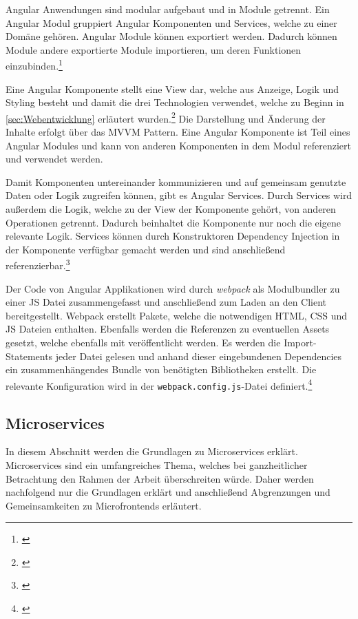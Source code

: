 Angular Anwendungen sind modular aufgebaut und in Module getrennt. Ein Angular Modul gruppiert Angular Komponenten und Services, welche zu einer Domäne gehören. Angular Module können exportiert werden. Dadurch können Module andere exportierte Module importieren, um deren Funktionen einzubinden.\footnote{\cite[vgl.][]{Angular2022d}}

Eine Angular Komponente stellt eine View dar, welche aus Anzeige, Logik und Styling besteht und damit die drei Technologien verwendet, welche zu Beginn in \cref{sec:Webentwicklung} erläutert wurden.\footnote{\cite[vgl.][]{Angular2022e}} Die Darstellung und Änderung der Inhalte erfolgt über das \gls{MVVM} Pattern. Eine Angular Komponente ist Teil eines Angular Modules und kann von anderen Komponenten in dem Modul referenziert und verwendet werden.

Damit Komponenten untereinander kommunizieren und auf gemeinsam genutzte Daten oder Logik zugreifen können, gibt es Angular Services. Durch Services wird außerdem die Logik, welche zu der View der Komponente gehört, von anderen Operationen getrennt. Dadurch beinhaltet die Komponente nur noch die eigene relevante Logik. Services können durch Konstruktoren Dependency Injection in der Komponente verfügbar gemacht werden und sind anschließend referenzierbar.\footnote{\cite[vgl.][]{Angular2022f}}

Der Code von Angular Applikationen wird durch \textit{webpack} als Modulbundler zu einer \gls{JS} Datei zusammengefasst und anschließend zum Laden an den Client bereitgestellt. Webpack erstellt Pakete, welche die notwendigen \gls{HTML}, \gls{CSS} und \gls{JS} Dateien enthalten. Ebenfalls werden die Referenzen zu eventuellen Assets gesetzt, welche ebenfalls mit veröffentlicht werden. Es werden die Import-Statements jeder Datei gelesen und anhand dieser eingebundenen Dependencies ein zusammenhängendes Bundle von benötigten Bibliotheken erstellt. Die relevante Konfiguration wird in der \texttt{webpack.config.js}-Datei definiert.\footnote{\cite[vgl.][]{Angular2022g}} 

\subsection{Microservices}\label{sec:Microservices}

In diesem Abschnitt werden die Grundlagen zu Microservices erklärt. Microservices sind ein umfangreiches Thema, welches bei ganzheitlicher Betrachtung den Rahmen der Arbeit überschreiten würde. Daher werden nachfolgend nur die Grundlagen erklärt und anschließend Abgrenzungen und Gemeinsamkeiten zu Microfrontends erläutert.


